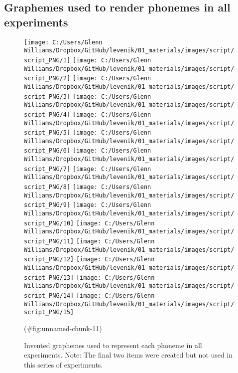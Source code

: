 \clearpage



\begin{appendix}
\section{}
\hypertarget{appendix-a}{%
\subsection{Graphemes used to render phonemes in all
experiments}\label{appendix-a}}

\begin{figure}[htb]

{\centering \texttt{[image: C:/Users/Glenn Williams/Dropbox/GitHub/levenik/01\_materials/images/script/script\_PNG/1]} \texttt{[image: C:/Users/Glenn Williams/Dropbox/GitHub/levenik/01\_materials/images/script/script\_PNG/2]} \texttt{[image: C:/Users/Glenn Williams/Dropbox/GitHub/levenik/01\_materials/images/script/script\_PNG/3]} \texttt{[image: C:/Users/Glenn Williams/Dropbox/GitHub/levenik/01\_materials/images/script/script\_PNG/4]} \texttt{[image: C:/Users/Glenn Williams/Dropbox/GitHub/levenik/01\_materials/images/script/script\_PNG/5]} \texttt{[image: C:/Users/Glenn Williams/Dropbox/GitHub/levenik/01\_materials/images/script/script\_PNG/6]} \texttt{[image: C:/Users/Glenn Williams/Dropbox/GitHub/levenik/01\_materials/images/script/script\_PNG/7]} \texttt{[image: C:/Users/Glenn Williams/Dropbox/GitHub/levenik/01\_materials/images/script/script\_PNG/8]} \texttt{[image: C:/Users/Glenn Williams/Dropbox/GitHub/levenik/01\_materials/images/script/script\_PNG/9]} \texttt{[image: C:/Users/Glenn Williams/Dropbox/GitHub/levenik/01\_materials/images/script/script\_PNG/10]} \texttt{[image: C:/Users/Glenn Williams/Dropbox/GitHub/levenik/01\_materials/images/script/script\_PNG/11]} \texttt{[image: C:/Users/Glenn Williams/Dropbox/GitHub/levenik/01\_materials/images/script/script\_PNG/12]} \texttt{[image: C:/Users/Glenn Williams/Dropbox/GitHub/levenik/01\_materials/images/script/script\_PNG/13]} \texttt{[image: C:/Users/Glenn Williams/Dropbox/GitHub/levenik/01\_materials/images/script/script\_PNG/14]} \texttt{[image: C:/Users/Glenn Williams/Dropbox/GitHub/levenik/01\_materials/images/script/script\_PNG/15]} 

}

\caption{Invented graphemes used to represent each phoneme in all experiments. Note: The final two items were created but not used in this series of experiments.}(\#fig:unnamed-chunk-11)
\end{figure}
\end{appendix}
